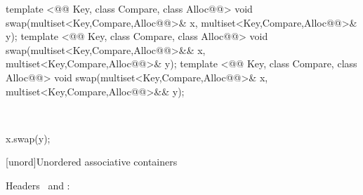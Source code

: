 \documentclass[american,twoside]{book}
\begin{document}
\begin{itemdecl}
template <@@ Key, class Compare, class Alloc@@>
  void swap(multiset<Key,Compare,Alloc@@>& x,
            multiset<Key,Compare,Alloc@@>& y);
template <@@ Key, class Compare, class Alloc@@>
  void swap(multiset<Key,Compare,Alloc@@>&& x,
            multiset<Key,Compare,Alloc@@>& y);
template <@@ Key, class Compare, class Alloc@@>
  void swap(multiset<Key,Compare,Alloc@@>& x,
            multiset<Key,Compare,Alloc@@>&& y);
\end{itemdecl}

\begin{itemdescr}
\pnum
\effects\ 
\begin{codeblock}
x.swap(y);
\end{codeblock}
\end{itemdescr}

[unord]{\marktr{}Unordered associative containers}

\pnum
Headers \ and :
\end{document}
